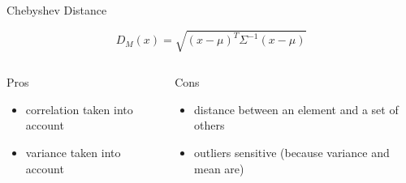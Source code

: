 \documentclass{beamer}
\begin{document}
\begin{frame}{Chebyshev Distance}

$$D_{M}(x)={\sqrt {(x-\mu )^{T}\Sigma ^{-1}(x-\mu )}}$$





\begin{scriptsize}
\begin{columns}[T,onlytextwidth]
\begin{block}{Pros}
\begin{itemize}
  \item correlation taken into account
   \item  variance taken into account
\end{itemize}
\end{block}
\begin{block}{Cons}
\begin{spacing}{0.9}
\begin{itemize}
  \item distance between an element and \alert{a set of others}
  \item outliers sensitive (because variance and mean are)
\end{itemize}
\end{spacing}
\end{block}
\end{columns}
\end{scriptsize}




\end{frame}
\end{document}
